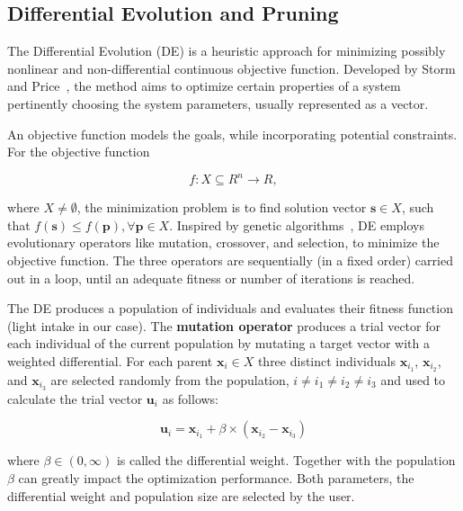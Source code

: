 \subsection{Differential Evolution and Pruning}
The Differential Evolution (DE) is a heuristic approach for minimizing possibly nonlinear and non-differential continuous objective function. Developed by Storm and Price~\cite{storn_differential_1997}, the method aims to optimize certain properties of a system pertinently choosing the system parameters, usually represented as a vector. 

An objective function models the goals, while incorporating potential constraints. For the objective function
\begin{linenomath}
\begin{equation}
f:X \subseteq\!R^{n}\rightarrow \!R,
\end{equation}
\end{linenomath}
where $X\neq\emptyset$, the minimization problem is to find solution vector $\mathbf{s}\in X$, such that $f(\mathbf{s})\leq f(\mathbf{p}), \forall \mathbf{p}\in X$. 
Inspired by genetic algorithms~\cite{davis1991handbook}, DE employs evolutionary operators like mutation, crossover, and selection, to minimize the objective function. The three operators are sequentially (in a fixed order) carried out in a loop, until an adequate fitness or number of iterations is reached.

The DE produces a population of individuals and evaluates their fitness function (light intake in our case). The \textbf{mutation operator} produces a trial vector for each individual of the current population by mutating a target vector with a weighted differential. 
For each parent $\mathbf{x}_{i}\in X$ three distinct individuals $\mathbf{x}_{i_1}$,  $\mathbf{x}_{i_2}$, and $\mathbf{x}_{i_3}$ are selected randomly from the population, $i \neq i_1 \neq i_2 \neq i_3$ and used to calculate the trial vector $\mathbf{u}_i$ as follows:
\begin{linenomath}
\begin{equation}
    \mathbf{u}_i = \mathbf{x}_{i_1}+\beta\times (\mathbf{x}_{i_2}-\mathbf{x}_{i_3})
\end{equation}
\end{linenomath}
where $\beta \in (0, \infty )$ is called the differential weight. Together with the population $\beta$ can greatly impact the optimization performance. Both parameters, the differential weight and population size are selected by the user.

